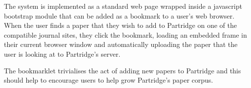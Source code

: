 The system is implemented as a standard web page wrapped inside a javascript
bootstrap module that can be added as a bookmark to a user's web browser. When
the user finds a paper that they wish to add to Partridge on one of the
compatible journal sites, they click the bookmark, loading an embedded frame in
their current browser window and automatically uploading the paper that the
user is looking at to Partridge's server. 

The bookmarklet trivialises the act of adding new papers to Partridge and this
should help to encourage users to help grow Partridge's paper corpus. 
